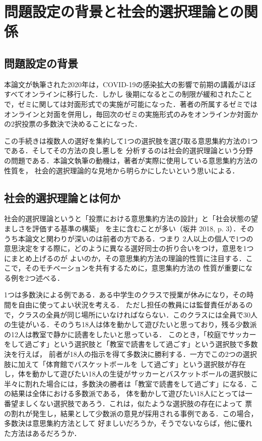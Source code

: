 \documentclass[dvipdfmx]{jsarticle}
\begin{document}
\newpage
\tableofcontents
\clearpage

\section{問題設定の背景と社会的選択理論との関係}\label{sec:問題設定の背景と社会的選択理論との関係}
\subsection{問題設定の背景}
本論文が執筆された2020年は，COVID-19の感染拡大の影響で前期の講義がほぼすべてオンラインに移行した．しかし
後期になるとこの制限が緩和されたことで，ゼミに関しては対面形式での実施が可能になった．著者の所属するゼミでは
オンラインと対面を併用し，毎回次のゼミの実施形式のみをオンラインか対面かの2択投票の多数決で決めることになった．

この手続きは複数人の選好を集約して1つの選択肢を選び取る意思集約方法の1つである．そしてその方法の良し悪しを
分析するのは社会的選択理論という分野の問題である．本論文執筆の動機は，著者が実際に使用している意思集約方法の性質を，
社会的選択理論的な見地から明らかにしたいという思いによる．

\subsection{社会的選択理論とは何か}\label{社会的選択とは何か}
社会的選択理論というと「投票における意思集約方法の設計」と「社会状態の望ましさを評価する基準の構築」
を主に含むことが多い（坂井 2018, p. 3）．そのうち本論文と関わりが深いのは前者の方である．つまり
2人以上の個人で1つの意思決定をする際に，どのように異なる選好同士の折り合いをつけ，意思を1つにまとめ上げるのが
よいのか，その意思集約方法の理論的性質に注目する．ここで，そのモチベーションを共有するために，意思集約方法の
性質が重要になる例を2つ述べる．

1つは多数決による例である．ある中学生のクラスで授業が休みになり，その時間を自由に使ってよい状況を考える．
ただし担任の教員には監督責任があるので，クラスの全員が同じ場所にいなければならない．このクラスには全員で30人
の生徒がいる．そのうち18人は体を動かして遊びたいと思っており，残る少数派の12人は教室で静かに読書をしたいと思っている．
このとき，「校庭でサッカーをして過ごす」という選択肢と「教室で読書をして過ごす」という選択肢で多数決を行えば，
前者が18人の指示を得て多数決に勝利する．一方でこの2つの選択肢に加えて「体育館でバスケットボールを
して過ごす」という選択肢が存在し，体を動かして遊びたい18人の生徒がサッカーとバスケットボールの選択肢に
半々に割れた場合には，多数決の勝者は「教室で読書をして過ごす」になる．この結果は全体における多数派である，
体を動かして遊びたい18人にとっては一番望ましくない選択肢であろう．これは，似たような選択肢の存在によって
票の割れが発生し，結果として少数派の意見が採用される事例である．この場合，多数決は意思集約方法として
好ましいだろうか，そうでないならば，他に優れた方法はあるだろうか．
\end{document}
